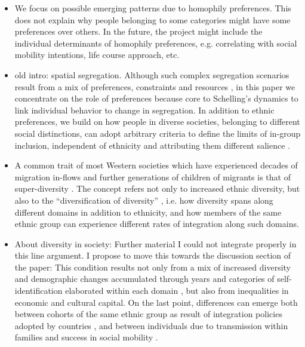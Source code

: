 \documentclass{article}
\begin{document}
\begin{itemize}

\item We focus on possible emerging patterns due to homophily preferences. This does not explain why people belonging to some categories might have some preferences over others. In the future, the project might include the individual determinants of homophily preferences,  e.g. correlating with social mobility intentions, life course approach, etc.

\item old intro: spatial segregation. Although such complex segregation scenarios result from a mix of preferences, constraints and resources \autocite{clark2015residential}, in this paper we concentrate on the role of preferences because core to Schelling’s dynamics to link individual behavior to change in segregation. In addition to ethnic preferences, we build on how people in diverse societies, belonging to different social distinctions, can adopt arbitrary criteria to define the limits of in-group inclusion, independent of ethnicity and attributing them different salience \autocite{albeda2018symbolic}.  

\item A common trait of most Western societies which have experienced decades of migration in-flows and further generations of children of migrants is that of super-diversity \autocite{vertovec2007super}. The concept refers not only to increased ethnic diversity, but also to the “diversification of diversity” \autocite[3, cfr Hollinger 1995]{martiniello2004combine}\autocite[cfr.]{hollinger1995beyond}, i.e. how diversity spans along different domains in addition to ethnicity, and how members of the same ethnic group can experience different rates of integration along such domains.  

\item About diversity in society: Further material I could not integrate properly in this line argument. I propose to move this towards the discussion section of the paper: This condition results not only from a mix of increased diversity and demographic changes accumulated through years \autocite{crul2016super} and categories of self-identification elaborated within each domain \autocite{vertovec2007super}, but also from inequalities in economic and cultural capital. On the last point, differences can emerge both between cohorts of the same ethnic group as result of integration policies adopted by countries  \autocite{crul2017upcoming}, and between individuals due to transmission within families and success in social mobility \autocite{Esser2010assimilation}.  
\end{itemize}
\end{document}
